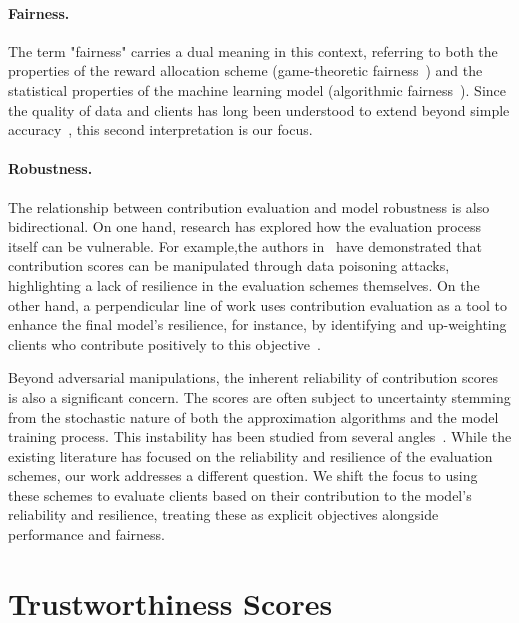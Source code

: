 \documentclass[sigconf]{acmart}
\begin{document}
\paragraph{Fairness. }

The term "fairness" carries a dual meaning in this context, referring to both the properties of the reward allocation scheme (game-theoretic fairness~\cite{rabin1993incorporating}) and the statistical properties of the machine learning model (algorithmic fairness~\cite{kleinberg2018algorithmic}). Since the quality of data and clients has long been understood to extend beyond simple accuracy~\cite{wang1996beyond}, this second interpretation is our focus. 

\paragraph{Robustness. }

The relationship between contribution evaluation and model robustness is also bidirectional. On one hand, research has explored how the evaluation process itself can be vulnerable. For example,the authors in~\cite{xu2024ace,pejo2025fragility} have demonstrated that contribution scores can be manipulated through data poisoning attacks, highlighting a lack of resilience in the evaluation schemes themselves. On the other hand, a perpendicular line of work uses contribution evaluation as a tool to enhance the final model's resilience, for instance, by identifying and up-weighting clients who contribute positively to this objective~\cite{guan2022few,otmani2024fedsv}.

Beyond adversarial manipulations, the inherent reliability of contribution scores is also a significant concern. The scores are often subject to uncertainty stemming from the stochastic nature of both the approximation algorithms and the model training process. This instability has been studied from several angles~\cite{pejo2025fragility,goldwasser2024stabilizing,wang2023data,qi2024mechanism}. While the existing literature has focused on the reliability and resilience of the evaluation schemes, our work addresses a different question. We shift the focus to using these schemes to evaluate clients based on their contribution to the model's reliability and resilience, treating these as explicit objectives alongside performance and fairness.

\section{Trustworthiness Scores}
\label{sec:mod}
\end{document}
